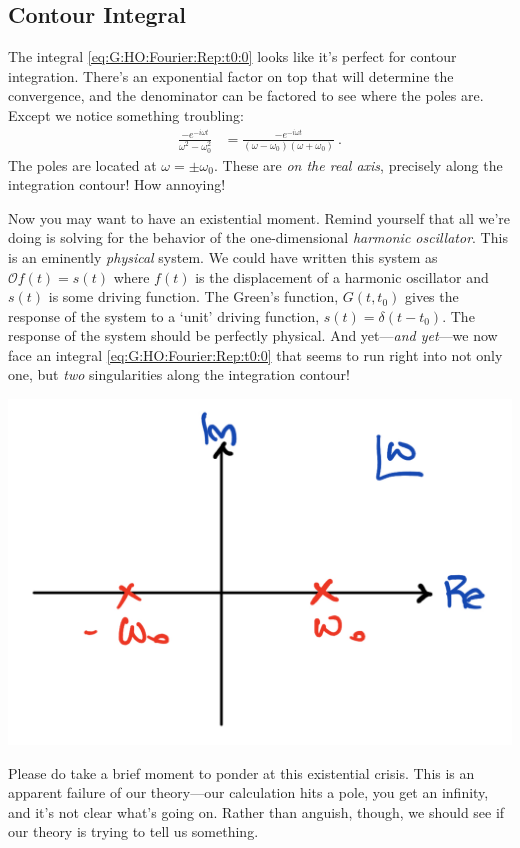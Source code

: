 \documentclass[
  11pt,
	colorful,
	raggedright,
]{tufte-style-thesis-flip}
\begin{document}
\subsection{Contour Integral}

The integral \eqref{eq:G:HO:Fourier:Rep:t0:0} looks like it's perfect for contour integration. There's an exponential factor on top that will determine the convergence, and the denominator can be factored to see where the poles are. Except we notice something troubling:
\begin{align}
  \frac{-e^{-i\omega t}}{\omega^2-\omega_0^2} 
  &=
  \frac{-e^{-i\omega t}}{(\omega - \omega_0)(\omega + \omega_0)} \ .
  \label{eq:HO:integrand:real:pole}
\end{align}
The poles are located at $\omega = \pm \omega_0$. These are \emph{on the real axis}, precisely along the integration contour! How annoying!

Now you may want to have an existential moment. Remind yourself that all we're doing is solving for the behavior of the one-dimensional \emph{harmonic oscillator}. This is an eminently \emph{physical} system. We could have written this system as $\mathcal O f(t) = s(t)$ where $f(t)$ is the displacement of a harmonic oscillator and $s(t)$ is some driving function. The Green's function, $G(t,t_0)$ gives the response of the system to a `unit' driving function, $s(t) = \delta(t-t_0)$. The response of the system should be perfectly physical. And yet---\emph{and yet}---we now face an integral \eqref{eq:G:HO:Fourier:Rep:t0:0} that seems to run right into not only one, but \emph{two} singularities along the integration contour!
\begin{center}
\includegraphics[width=.4\textwidth]{figures/Lec_2017_16_HO_Poles.pdf}
\end{center}
Please do take a brief moment to ponder at this existential crisis. This is an apparent failure of our theory---our calculation hits a pole, you get an infinity, and it's not clear what's going on. Rather than anguish, though, we should see if our theory is trying to tell us something. 
\end{document}
